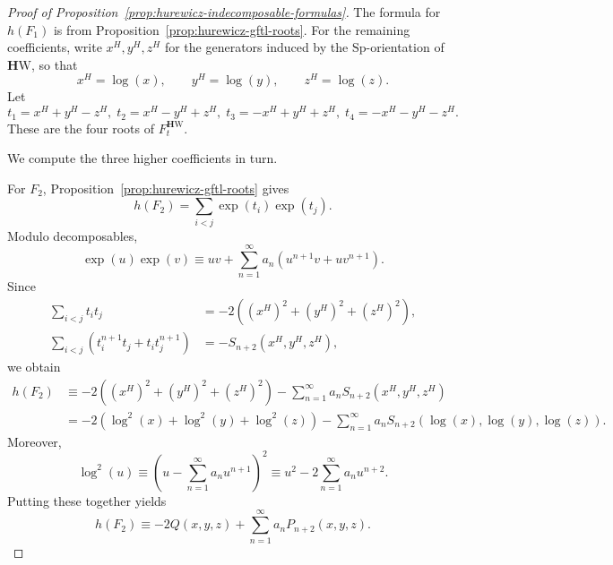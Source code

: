 \documentclass[a4paper]{amsart}
\theoremstyle{plain}
\theoremstyle{definition}
\newcommand{\Sp}{\mathrm{Sp}}
\newcommand{\HW}{\mathbf{H}\mathrm{W}}
\begin{document}
\begin{proof}[Proof of Proposition~\ref{prop:hurewicz-indecomposable-formulas}]
	The formula for $h(F_1)$ is from Proposition~\ref{prop:hurewicz-gftl-roots}. For the remaining coefficients, write $x^H,y^H,z^H$ for the generators induced by the $\Sp$-orientation of $\HW$, so that
	\[
		x^H=\log(x),\qquad y^H=\log(y),\qquad z^H=\log(z).
	\]
	Let
	\[
		t_1=x^H+y^H-z^H,\; t_2=x^H-y^H+z^H,\; t_3=-x^H+y^H+z^H,\; t_4=-x^H-y^H-z^H.
	\]
	These are the four roots of $F_t^{\HW}$.

	We compute the three higher coefficients in turn.

	For $F_2$, Proposition~\ref{prop:hurewicz-gftl-roots} gives
	\[
		h(F_2)=\sum_{i<j}\exp(t_i)\exp(t_j).
	\]
	Modulo decomposables,
	\[
		\exp(u)\exp(v)\equiv uv+\sum_{n=1}^{\infty}a_n\left(u^{n+1}v+uv^{n+1}\right).
	\]
	Since
	\[
		\begin{aligned}
			\sum_{i<j}t_it_j
			 & =-2\left((x^H)^2+(y^H)^2+(z^H)^2\right), \\
			\sum_{i<j}\left(t_i^{n+1}t_j+t_it_j^{n+1}\right)
			 & =-S_{n+2}(x^H,y^H,z^H),
		\end{aligned}
	\]
	we obtain
	\[
		\begin{aligned}
			h(F_2)
			 & \equiv -2\left((x^H)^2+(y^H)^2+(z^H)^2\right)-\sum_{n=1}^{\infty}a_n S_{n+2}(x^H,y^H,z^H)               \\
			 & = -2\left(\log^2(x)+\log^2(y)+\log^2(z)\right)-\sum_{n=1}^{\infty}a_n S_{n+2}(\log(x),\log(y),\log(z)).
		\end{aligned}
	\]
	Moreover,
	\[
		\log^2(u)\equiv \left(u-\sum_{n=1}^{\infty}a_nu^{n+1}\right)^2
		\equiv u^2-2\sum_{n=1}^{\infty}a_nu^{n+2}.
	\]
	Putting these together yields
	\[
		h(F_2)\equiv -2Q(x,y,z)
		+\sum_{n=1}^{\infty}a_n P_{n+2}(x,y,z).
	\]


\end{proof}
\end{document}
